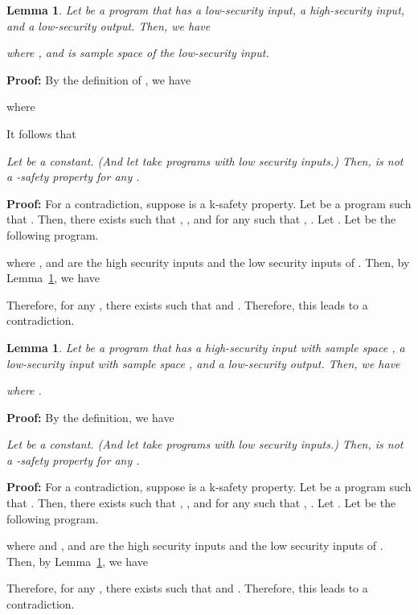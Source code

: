 \documentclass{llncs}
\newtheorem{lemma}[theorem]{Lemma}
\newenvironment{proof}{\noindent\rm{\bf Proof:}}{\hbox{}\vspace*{0.2\baselineskip}}
\newenvironment{reftheorem}[1]{\begin{trivlist}\item[\hskip
      \labelsep{\bf Theorem #1.}]\it}{\end{trivlist}}
\begin{document}
\begin{lemma}
\label{lem:mel}
  Let  be a program that has a low-security input, a high-security
  input, and a low-security output.  Then, we have

where , and  is sample space of the low-security
input.
\end{lemma}
\begin{proof}
By the definition of , we have

where

It follows that 

\end{proof}

\begin{reftheorem}{\ref{thm:menk}}
  Let  be a constant.  (And let  take programs with
  low security inputs.) Then,  is not a -safety
  property for any .
\end{reftheorem}
\begin{proof}
  For a contradiction, suppose  is a k-safety property.
  Let  be a program such that .  Then,
  there exists  such that , , and
  for any  such that , .  Let
  .  Let
   be the following program.

where , and  are the high security inputs and the low security
inputs of .  Then, by Lemma~\ref{lem:mel}, we have

Therefore, for any , there exists  such that
 and .
Therefore, this leads to a contradiction.
\end{proof}

\begin{lemma}
\label{lem:geu2}
Let  be a program that has a high-security input with sample space
, a low-security input with sample space , and
a low-security output.  Then, we have
 
where .
\end{lemma}
\begin{proof}
By the definition, we have

\end{proof}

\begin{reftheorem}{\ref{thm:genk}}
Let  be a constant.  (And let  take programs with
low security inputs.) Then,  is not a -safety
property for any .
\end{reftheorem}
\begin{proof}
  For a contradiction, suppose  is a k-safety property.
  Let  be a program such that .  Then,
  there exists  such that , , and
  for any  such that , .  Let
  .  Let
   be the following program.

where  and , and
 are the high security inputs and
the low security inputs of .  Then, by Lemma~\ref{lem:geu2},
we have

Therefore, for any , there exists  such that
 and .
Therefore, this leads to a contradiction.
\end{proof}
\end{document}

